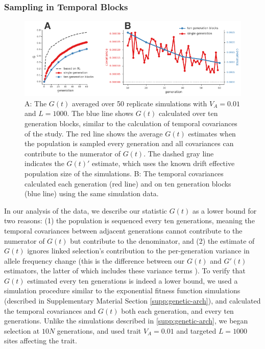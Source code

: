 \documentclass[11pt]{article}
\begin{document}
\subsubsection{Sampling in Temporal Blocks}
\label{supp:tempblocks}

\begin{figure}[!ht]
  \centering
  \includegraphics[width=\textwidth]{figures/fig-supp-blocks.pdf}

  \caption{A: The $G(t)$ averaged over 50 replicate simulations with $V_A =
    0.01$ and $L = 1000$. The blue line shows $G(t)$ calculated over ten
    generation blocks, similar to the calculation of temporal covariances of
    the \textcite{Barghi2019-qy} study. The red line shows the average $G(t)$
    estimates when the population is sampled every generation and all
    covariances can contribute to the numerator of $G(t)$. The dashed gray line
    indicates the $G(t)'$ estimate, which uses the known drift effective
    population size of the simulations. B: The temporal covariances calculated
    each generation (red line) and on ten generation blocks (blue line) using the
    same simulation data.}

  \label{suppfig:supp-blocks}
\end{figure}

In our analysis of the \textcite{Barghi2019-qy} data, we describe our statistic
$G(t)$ as a lower bound for two reasons: (1) the population is sequenced every
ten generations, meaning the temporal covariances between adjacent generations
cannot contribute to the numerator of $G(t)$ but contribute to the denominator,
and (2) the estimate of $G(t)$ ignores linked selection's contribution to the
per-generation variance in allele frequency change (this is the difference
between our $G(t)$ and $G'(t)$ estimators, the latter of which includes these
variance terms \parencite{Buffalo2019-io}).  To verify that $G(t)$ estimated
every ten generations is indeed a lower bound, we used a simulation procedure
similar to the exponential fitness function simulations (described in
Supplementary Material Section \ref{supp:genetic-arch}), and calculated the
temporal covariances and $G(t)$ both each generation, and every ten
generations. Unlike the simulations described in \ref{supp:genetic-arch}, we
began selection at $10N$ generations, and used trait $V_A = 0.01$ and targeted
$L = 1000$ sites affecting the trait. 
\end{document}
